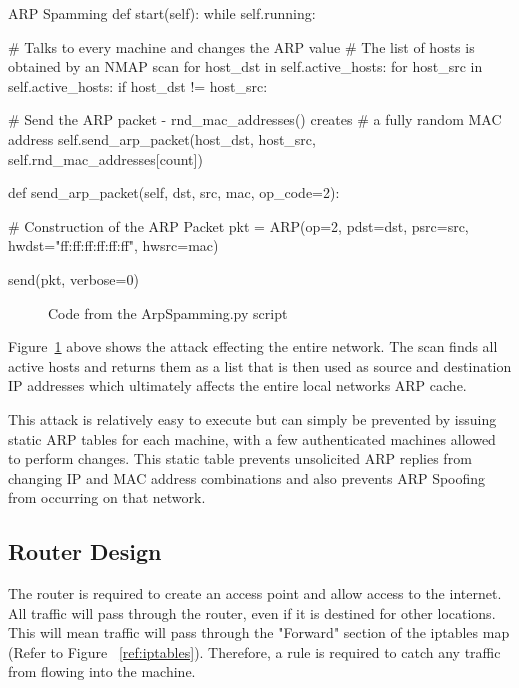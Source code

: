 \begin{Code}{ARP Spamming}
def start(self):
   while self.running:
        
       # Talks to every machine and changes the ARP value
       # The list of hosts is obtained by an NMAP scan
       for host_dst in self.active_hosts:
           for host_src in self.active_hosts:
           	  if host_dst != host_src:
                 
           	  	# Send the ARP packet - rnd_mac_addresses() creates
           	  	# a fully random  MAC address
           	  	self.send_arp_packet(host_dst, 
                                    host_src, 
                                    self.rnd_mac_addresses[count])


def send_arp_packet(self, dst, src, mac, op_code=2):
        
    # Construction of the ARP Packet
    pkt = ARP(op=2, 
              pdst=dst, 
              psrc=src, 
              hwdst="ff:ff:ff:ff:ff:ff", 
              hwsrc=mac)

    send(pkt, verbose=0)
					
\end{Code}
\begin{figure}[h]
	\caption{Code from the ArpSpamming.py script}
	\label{fig:ArpSpammingCode}
\end{figure}


Figure~\ref{fig:ArpSpammingCode} above shows the attack effecting the entire network. The scan finds all active hosts and returns them as a list that is then used as source and destination IP addresses which ultimately affects the entire local networks ARP cache.

This attack is relatively easy to execute but can simply be prevented by issuing static ARP tables for each machine, with a few authenticated machines allowed to perform changes. This static table prevents unsolicited ARP replies from changing IP and MAC address combinations and also prevents ARP Spoofing from occurring on that network.


\subsection{Router Design}
The router is required to create an access point and allow access to the internet. All traffic will pass through the router, even if it is destined for other locations. This will mean traffic will pass through the "Forward" section of the iptables map (Refer to Figure ~\ref{ref:iptables}). Therefore, a rule is required to catch any traffic from flowing into the machine. 

